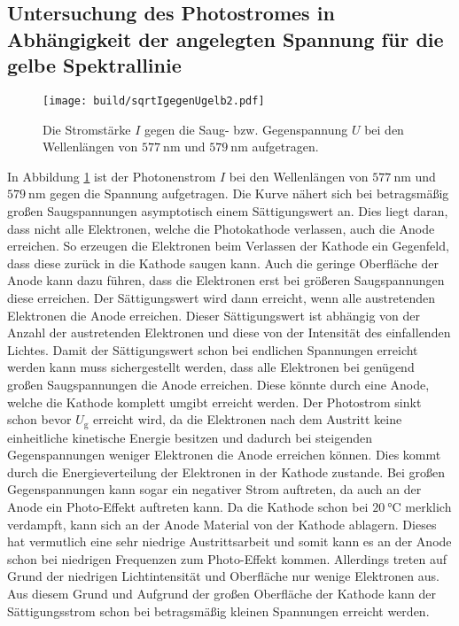 \subsection{Untersuchung des Photostromes in Abhängigkeit der angelegten Spannung für die gelbe Spektrallinie}
\begin{figure}
	\centering
	\caption{Die Stromstärke $I$ gegen die Saug- bzw. Gegenspannung $U$ bei den Wellenlängen von $\SI{577}{\nano\meter}$ und $ \SI{579}{\nano\meter}$ aufgetragen.}
	\texttt{[image: build/sqrtIgegenUgelb2.pdf]}
	\label{fig:Graphgelb2}
\end{figure}
In Abbildung \ref{fig:Graphgelb2} ist der Photonenstrom $I$ bei den Wellenlängen von $\SI{577}{\nano\meter}$ und $\SI{579}{\nano\meter}$ gegen die Spannung aufgetragen. Die Kurve nähert sich bei betragsmäßig großen Saugspannungen asymptotisch  einem Sättigungswert an. Dies liegt daran, dass nicht alle Elektronen, welche die Photokathode verlassen, auch die Anode erreichen. So erzeugen die Elektronen beim Verlassen der Kathode ein Gegenfeld, dass diese zurück in die Kathode saugen kann. Auch die geringe Oberfläche der Anode kann dazu führen, dass die Elektronen erst bei größeren Saugspannungen diese erreichen. Der Sättigungswert wird dann erreicht, wenn alle austretenden Elektronen die Anode erreichen. Dieser Sättigungswert ist abhängig von der Anzahl der austretenden Elektronen und diese von der Intensität des einfallenden Lichtes. Damit der Sättigungswert schon bei endlichen Spannungen erreicht werden kann muss sichergestellt werden, dass alle Elektronen bei genügend großen Saugspannungen die Anode erreichen. Diese könnte durch eine Anode, welche die Kathode komplett umgibt erreicht werden. Der Photostrom sinkt schon bevor $U_\text{g}$ erreicht wird, da die Elektronen nach dem Austritt keine einheitliche kinetische Energie besitzen und dadurch bei steigenden Gegenspannungen weniger Elektronen die Anode erreichen können. Dies kommt durch die Energieverteilung der Elektronen in der Kathode zustande. Bei großen Gegenspannungen kann sogar ein negativer Strom auftreten, da auch an der Anode ein Photo-Effekt auftreten kann. Da die Kathode schon bei $\SI{20}{\degreeCelsius}$ \cite{V500} merklich verdampft, kann sich an der Anode Material von der Kathode ablagern. Dieses hat vermutlich eine sehr niedrige Austrittsarbeit und somit kann es an der Anode schon bei niedrigen Frequenzen zum Photo-Effekt kommen. Allerdings treten auf Grund der niedrigen Lichtintensität und Oberfläche nur wenige Elektronen aus. Aus diesem Grund und Aufgrund der großen Oberfläche der Kathode kann der Sättigungsstrom schon bei betragsmäßig kleinen Spannungen erreicht werden.





 

 